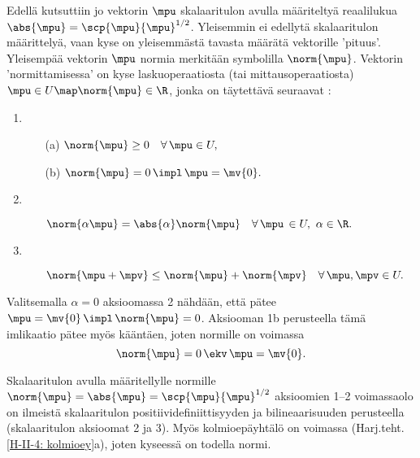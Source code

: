 Edellä kutsuttiin jo vektorin $\mpu$  skalaaritulon avulla määriteltyä
reaalilukua $\abs{\mpu}=\scp{\mpu}{\mpu}^{1/2}$. Yleisemmin  
ei edellytä skalaaritulon määrittelyä, vaan kyse on yleisemmästä tavasta määrätä vektorille
'pituus'. Yleisempää vektorin $\mpu$ normia merkitään symbolilla $\norm{\mpu}$. Vektorin
'normittamisessa' on kyse laskuoperaatiosta (tai mittausoperaatiosta) 
$\mpu \in U \map \norm{\mpu}\in\R$, jonka on täytettävä seuraavat :
\begin{enumerate}
\item {} 
\begin{itemize}
\item[(a)] $\norm{\mpu} \ge 0 \quad \forall\,\mpu \in U,$ 
\item[(b)] $\norm{\mpu}=0\,\impl\,\mpu=\mv{0}.$
\end{itemize}
\item {} 
\begin{itemize} 
\item[]$\norm{\alpha\mpu}=\abs{\alpha}\norm{\mpu} \quad \forall\,\mpu\,\in U,\ \alpha\in\R.$
\end{itemize}
\item {} 
\begin{itemize}
\item[] $\norm{\mpu+\mpv} \le \norm{\mpu}+\norm{\mpv} \quad \forall\,\mpu,\mpv \in U.$
\end{itemize}
\end{enumerate}
Valitsemalla $\alpha=0$ aksioomassa 2 nähdään, että pätee $\mpu=\mv{0}\,\impl\,\norm{\mpu}=0$.
Aksiooman 1b perusteella tämä imlikaatio pätee myös kääntäen, joten normille on voimassa
\[
\norm{\mpu}=0\,\ekv\,\mpu=\mv{0}.
\]
\begin{Exa}
Skalaaritulon avulla määritellylle normille $\norm{\mpu}=\abs{\mpu}=\scp{\mpu}{\mpu}^{1/2}$
aksioomien 1--2 voimassaolo on ilmeistä skalaaritulon positiividefiniittisyyden ja 
bilineaarisuuden perusteella (skalaaritulon aksioomat 2 ja 3). Myös kolmioepäyhtälö on voimassa 
(Harj.teht.\,\ref{H-II-4: kolmioey}a), joten kyseessä on todella normi. \loppu
\end{Exa}
